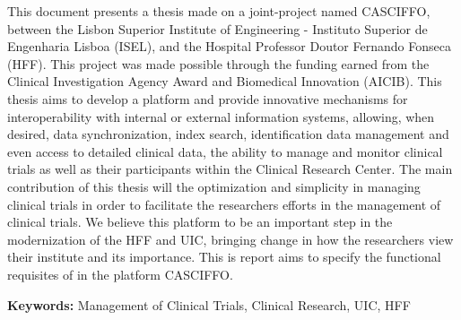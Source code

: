 
This document presents a thesis made on a joint-project named CASCIFFO, between the Lisbon Superior Institute of Engineering - Instituto Superior de Engenharia Lisboa (ISEL), and the Hospital Professor Doutor Fernando Fonseca (HFF). This project was made possible through the funding earned from the Clinical Investigation Agency Award and Biomedical Innovation (AICIB). 
This thesis aims to develop a platform and provide innovative mechanisms for interoperability with internal or external information systems, allowing, when desired, data synchronization, index search, identification data management and even access to detailed clinical data, the ability to manage and monitor clinical trials as well as their participants within the Clinical Research Center. 
The main contribution of this thesis will the optimization and simplicity in managing clinical trials in order to facilitate the researchers efforts in the management of clinical trials.
We believe this platform to be an important step in the modernization of the HFF and UIC, bringing change in how the researchers view their institute and its importance. 
This is report aims to specify the functional requisites of in the platform CASCIFFO. 

\textbf{Keywords:} Management of Clinical Trials, Clinical Research, UIC, HFF